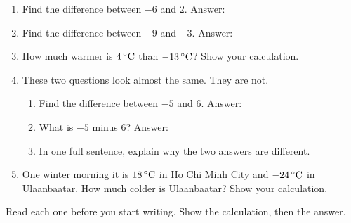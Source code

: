 \documentclass[12pt,a4paper]{article}
\begin{document}
\begin{enumerate}[label=\arabic*.]
  \item Find the difference between $-6$ and $2$. \hfill Answer: \blank[2.8cm]
  \item Find the difference between $-9$ and $-3$. \hfill Answer: \blank[2.8cm]
  \item How much warmer is $4\,^{\circ}\mathrm{C}$ than $-13\,^{\circ}\mathrm{C}$? Show your calculation.
  \item These two questions look almost the same. They are not.
        \begin{enumerate}[label=(\alph*), itemsep=9pt]
          \item Find the difference between $-5$ and $6$. \hfill Answer: \blank[2.8cm]
          \item What is $-5$ minus $6$? \hfill Answer: \blank[2.8cm]
          \item In one full sentence, explain why the two answers are different.
        \end{enumerate}
  \item One winter morning it is $18\,^{\circ}\mathrm{C}$ in Ho Chi Minh City and $-24\,^{\circ}\mathrm{C}$ in
        Ulaanbaatar. How much colder is Ulaanbaatar? Show your calculation.
\end{enumerate}


\noindent Read each one  before you start writing.
Show the calculation, then the answer.
\end{document}
